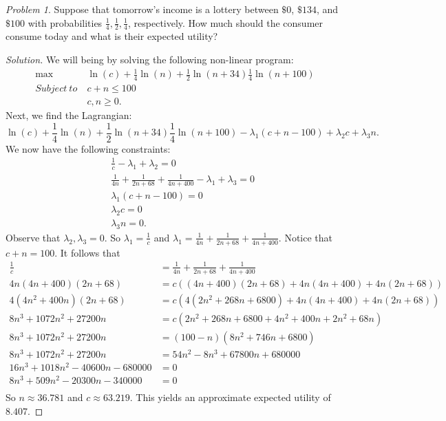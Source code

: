 \documentclass[12pt]{article}
\theoremstyle{definition}
\theoremstyle{remark}
\newtheorem{prob}{Problem}[section]
\begin{document}
\begin{prob}
  Suppose that tomorrow's income is a lottery between $\$0 $, $\$134 $, and $\$100 $ with probabilities $\frac{1}{4}, \frac{1}{2}, \frac{1}{4}$, respectively. How much should the consumer consume today and what is their expected utility?
\end{prob}
\begin{proof}[Solution]
  We will being by solving the following non-linear program:
  \begin{align*}
    \max &\ln(c) + \frac{1}{4}\ln(n) + \frac{1}{2}\ln(n + 34) \frac{1}{4}\ln(n + 100) &\\
    Subject \ to \ &c + n \leq 100 & \\
    & c, n \geq 0. &
  \end{align*}
  Next, we find the Lagrangian:
  $$\ln(c) + \frac{1}{4}\ln(n) + \frac{1}{2}\ln(n + 34) \frac{1}{4}\ln(n + 100) - \lambda_1(c + n - 100) + \lambda_2c + \lambda_3n.$$
  We now have the following constraints:
  \begin{align*}
    &\frac{1}{c} - \lambda_1 + \lambda_2 = 0 \\
    &\frac{1}{4n} + \frac{1}{2n + 68} + \frac{1}{4n + 400} - \lambda_1 + \lambda_3 = 0 \\
    &\lambda_1(c + n - 100) = 0 \\
    &\lambda_2c = 0 \\
    &\lambda_3n = 0.
  \end{align*}
  Observe that $\lambda_2, \lambda_3 = 0$. So $\lambda_1 = \frac{1}{c}$ and $\lambda_1 = \frac{1}{4n} + \frac{1}{2n+ 68} + \frac{1}{4n + 400}$. Notice that $c + n = 100$. It follows that
  \begin{align*}
    \frac{1}{c} &= \frac{1}{4n} + \frac{1}{2n+ 68} + \frac{1}{4n + 400} \\
    4n(4n + 400)(2n + 68) &= c((4n + 400)(2n + 68) + 4n(4n + 400) + 4n(2n + 68)) \\
    4(4n^2 + 400n)(2n + 68) &= c(4(2n^2 + 268n + 6800) + 4n(4n + 400) + 4n(2n + 68)) \\
    8n^3 + 1072n^2 +27200n &= c(2n^2 + 268n + 6800 + 4n^2 + 400n + 2n^2 + 68n) \\
    8n^3 + 1072n^2 +27200n &= (100 - n)(8n^2 + 746n + 6800) \\
    8n^3 + 1072n^2 +27200n &= 54n^2 - 8n^3 + 67800n + 680000  \\
    16n^3 + 1018n^2 - 40600n - 680000 &= 0\\
    8n^3 + 509n^2 - 20300n - 340000 &= 0\\
  \end{align*}
  So $n \approx 36.781$ and $c \approx 63.219$. This yields an approximate expected utility of $8.407$.
\end{proof}
\end{document}

